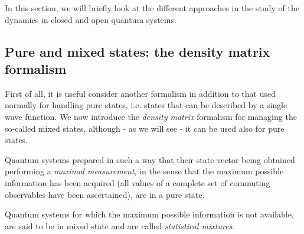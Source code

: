 In this section, we will briefly look at the different approaches in the study of the dynamics in closed and open quantum systems. 

\subsection{Pure and mixed states: the density matrix formalism}
First of all, it is useful consider another formalism in addition to that used normally for handling pure states, i.e. states that can be described by a single wave function. We now introduce the \emph{density matrix} formalism for managing the so-called mixed states, although - as we will see - it can be used also for pure states.

Quantum systems prepared in such a way that their state vector being obtained performing a \emph{maximal measurement}, in the sense that the maximum possible information has been acquired (all values of a complete set of commuting observables have been ascertained), are in a pure state. 

Quantum systems for which the maximum possible information is not available, are said to be in mixed state and are called \emph{statistical mixtures}.

